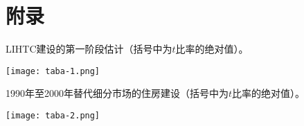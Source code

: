 \documentclass[lang=cn,11pt,a4paper]{paper}
\begin{document}
\appendix
\setcounter{table}{0}
\renewcommand\thetable{A-\arabic{table}}
\section*{附录}

\begin{table}[h]
  \caption{LIHTC建设的第一阶段估计（括号中为$t$比率的绝对值）。}\label{taba-1}
  \texttt{[image: taba-1.png]}
\noindent{}
\end{table}

\begin{table}[h]
  \caption{1990年至2000年替代细分市场的住房建设（括号中为$t$比率的绝对值）。}\label{taba-2}
  \texttt{[image: taba-2.png]}
\end{table}


\end{document}
